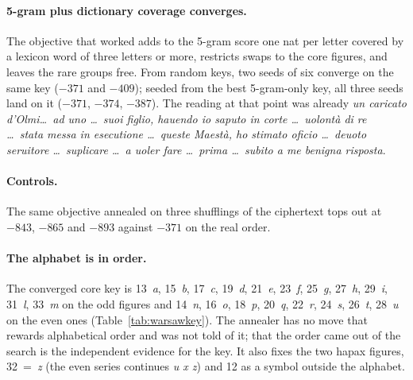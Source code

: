 \documentclass[11pt]{article}
\begin{document}
\paragraph{5-gram plus dictionary coverage converges.} The objective that worked adds to the 5-gram score one nat per letter covered by a lexicon word of three letters or more, restricts swaps to the core figures, and leaves the rare groups free. From random keys, two seeds of six converge on the same key ($-371$ and $-409$); seeded from the best 5-gram-only key, all three seeds land on it ($-371$, $-374$, $-387$). The reading at that point was already \emph{un caricato d'Olmi\ldots\ ad uno \ldots\ suoi figlio, hauendo io saputo in corte \ldots\ uolont\`a di re \ldots\ stata messa in esecutione \ldots\ queste Maest\`a, ho stimato oficio \ldots\ deuoto seruitore \ldots\ suplicare \ldots\ a uoler fare \ldots\ prima \ldots\ subito a me benigna risposta}.

\paragraph{Controls.} The same objective annealed on three shufflings of the ciphertext tops out at $-843$, $-865$ and $-893$ against $-371$ on the real order.

\paragraph{The alphabet is in order.} The converged core key is 13~\emph{a}, 15~\emph{b}, 17~\emph{c}, 19~\emph{d}, 21~\emph{e}, 23~\emph{f}, 25~\emph{g}, 27~\emph{h}, 29~\emph{i}, 31~\emph{l}, 33~\emph{m} on the odd figures and 14~\emph{n}, 16~\emph{o}, 18~\emph{p}, 20~\emph{q}, 22~\emph{r}, 24~\emph{s}, 26~\emph{t}, 28~\emph{u} on the even ones (Table~\ref{tab:warsawkey}). The annealer has no move that rewards alphabetical order and was not told of it; that the order came out of the search is the independent evidence for the key. It also fixes the two hapax figures, 32~=~\emph{z} (the even series continues \emph{u x z}) and 12 as a symbol outside the alphabet.
\end{document}
